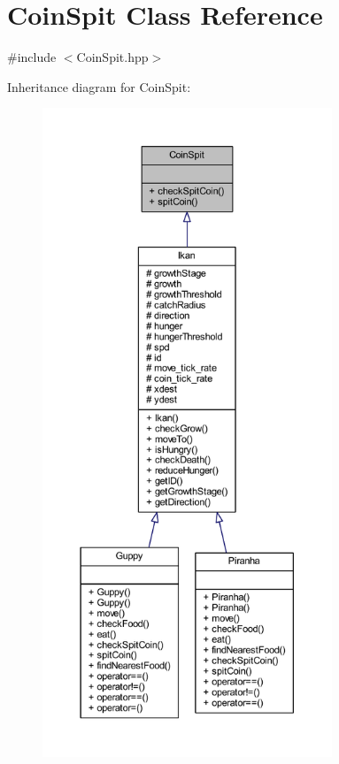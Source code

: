 \hypertarget{class_coin_spit}{}\section{Coin\+Spit Class Reference}
\label{class_coin_spit}


{\ttfamily \#include $<$Coin\+Spit.\+hpp$>$}



Inheritance diagram for Coin\+Spit\+:
\nopagebreak
\begin{figure}[H]
\begin{center}
\leavevmode
\includegraphics[height=550pt]{class_coin_spit__inherit__graph}
\end{center}
\end{figure}


